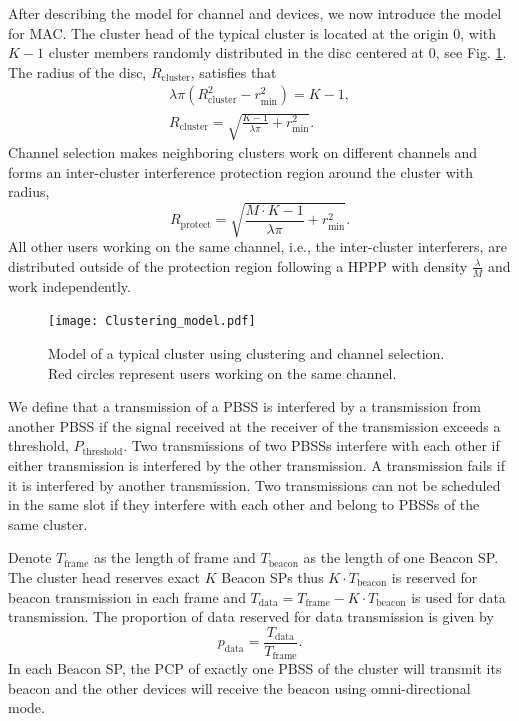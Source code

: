 \documentclass[10pt, conference, letterpaper]{IEEEtran}
\begin{document}
After describing the model for channel and devices, we now introduce the model for MAC. 
The cluster head of the typical cluster is located at the origin $0$, with $K-1$ cluster members randomly distributed in the disc centered at $0$, see Fig. \ref{fig:clusteranalysis:model}. The radius of the disc, $R_{\mathrm{cluster}}$, satisfies that 
\begin{align*}
\lambda\pi (R_{\mathrm{cluster}}^2 - r_{\min}^2) = K - 1,\\
R_{\mathrm{cluster}} = \sqrt{\frac{K - 1}{\lambda\pi}+r_{\min}^2}.
\end{align*}
Channel selection makes neighboring clusters work on different channels and forms an inter-cluster interference protection region around the cluster with radius, 
\begin{equation*}
R_{\mathrm{protect}} = \sqrt{\frac{M\cdot K - 1}{\lambda \pi} + r_{\min}^2}.
\end{equation*}
All other users working on the same channel, i.e., the inter-cluster interferers, are distributed outside of the protection region following a HPPP with density $\frac{\lambda}{M}$ and work independently.

\begin{figure}
	\centering
	\texttt{[image: Clustering\_model.pdf]}
	\caption{Model of a typical cluster using clustering and channel selection. Red circles represent users working on the same channel.}
	\label{fig:clusteranalysis:model}
\end{figure}

We define that a transmission of a PBSS is interfered by a transmission from another PBSS if the signal received at the receiver of the transmission exceeds a threshold, $P_{\mathrm{threshold}}$. 
Two transmissions of two PBSSs interfere with each other if either transmission is interfered by the other transmission. 
A transmission fails if it is interfered by another transmission. Two transmissions can not be scheduled in the same slot if they interfere with each other and belong to PBSSs of the same cluster.

Denote $T_{\mathrm{frame}}$ as the length of frame and $T_{\mathrm{beacon}}$ as the length of one Beacon SP. The cluster head reserves exact $K$ Beacon SPs thus $K\cdot T_{\mathrm{beacon}}$ is reserved for beacon transmission in each frame and $T_{\mathrm{data}} = T_{\mathrm{frame}} - K\cdot T_{\mathrm{beacon}}$ is used for data transmission. The proportion of data reserved for data transmission is given by
\begin{equation*}
p_{\mathrm{data}} = \frac{T_{\mathrm{data}}}{T_{\mathrm{frame}}}.
\end{equation*}
In each Beacon SP, the PCP of exactly one PBSS of the cluster will transmit its beacon and the other devices will receive the beacon using omni-directional mode. 
\end{document}
